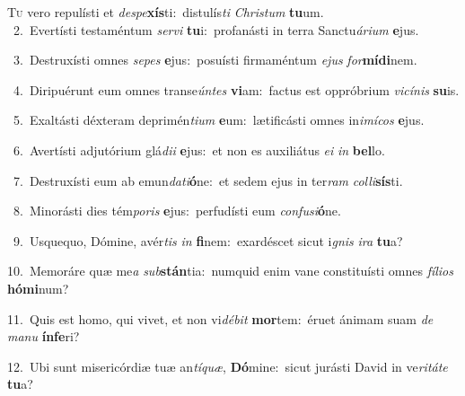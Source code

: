 \lettrine{\initial\textcolor{\initialcolor}{T}}{u} vero repulísti et \textit{de}\-\textit{spe}\textbf{xís}ti:~\star distulís\textit{ti} \textit{Chris}\-\textit{tum} \textbf{tu}\-um.\\
{\numbfont\textcolor{\numbcolor}{~2.}}~Evertísti testaméntum \textit{ser}\-\textit{vi} \textbf{tu}\-i:~\star profanásti in terra Sanctu\-\textit{á}\-\textit{ri}\textit{um} \textbf{e}\-jus.\par
{\numbfont\textcolor{\numbcolor}{~3.}}~Destruxísti omnes \textit{se}\-\textit{pes} \textbf{e}\-jus:~\star posuísti firmaméntum \textit{e}\-\textit{jus} \textit{for}\-\textbf{mí}\textbf{di}nem.\par
{\numbfont\textcolor{\numbcolor}{~4.}}~Diripuérunt eum omnes transe\-\textit{ún}\-\textit{tes} \textbf{vi}\-am:~\star factus est oppróbrium \textit{vi}\-\textit{cí}\textit{nis} \textbf{su}\-is.\par
{\numbfont\textcolor{\numbcolor}{~5.}}~Exaltásti déxteram deprimén\-\textit{ti}\-\textit{um} \textbf{e}\-um:~\star lætificásti omnes in\-\textit{i}\-\textit{mí}\textit{cos} \textbf{e}\-jus.\par
{\numbfont\textcolor{\numbcolor}{~6.}}~Avertísti adjutórium glá\-\textit{di}\-\textit{i} \textbf{e}\-jus:~\star et non es auxiliátus \textit{e}\-\textit{i} \textit{in} \textbf{bel}\-lo.\par
{\numbfont\textcolor{\numbcolor}{~7.}}~Destruxísti eum ab emun\-\textit{da}\-\textit{ti}\textbf{ó}ne:~\star et sedem ejus in ter\textit{ram} \textit{col}\-\textit{li}\textbf{sís}ti.\par
{\numbfont\textcolor{\numbcolor}{~8.}}~Minorásti dies tém\-\textit{po}\-\textit{ris} \textbf{e}\-jus:~\star perfudísti eum \textit{con}\-\textit{fu}\textit{si}\textbf{ó}ne.\par
{\numbfont\textcolor{\numbcolor}{~9.}}~Usquequo, Dómine, avér\textit{tis} \textit{in} \textbf{fi}\-nem:~\star exardéscet sicut i\textit{gnis} \textit{i}\-\textit{ra} \textbf{tu}\-a?\par
{\numbfont\textcolor{\numbcolor}{10.}}~Memoráre quæ me\textit{a} \textit{sub}\-\textbf{stán}tia:~\star numquid enim vane constituísti omnes \textit{fí}\-\textit{li}\textit{os} \textbf{hó}\-\textbf{mi}num?\par
{\numbfont\textcolor{\numbcolor}{11.}}~Quis est homo, qui vivet, et non vi\-\textit{dé}\-\textit{bit} \textbf{mor}\-tem:~\star éruet ánimam suam \textit{de} \textit{ma}\-\textit{nu} \textbf{ín}\-\textbf{fe}ri?\par
{\numbfont\textcolor{\numbcolor}{12.}}~Ubi sunt misericórdiæ tuæ an\-\textit{tí}\-\textit{quæ}, \textbf{Dó}\-mine:~\star sicut jurásti David in ve\-\textit{ri}\-\textit{tá}\textit{te} \textbf{tu}\-a?\par
